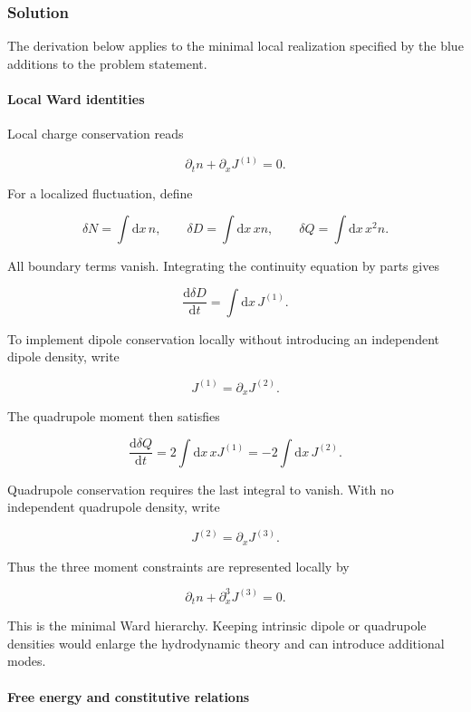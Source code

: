 \subsubsection*{Solution}

\begingroup
\color{blue}

The derivation below applies to the minimal local realization specified by the
blue additions to the problem statement.

\paragraph*{Local Ward identities}

Local charge conservation reads

\[
\partial_t n+\partial_x J^{(1)}=0.
\]

For a localized fluctuation, define

\[
\delta N=\int\mathrm{d}x\,n,
\qquad
\delta D=\int\mathrm{d}x\,x n,
\qquad
\delta Q=\int\mathrm{d}x\,x^2 n.
\]

All boundary terms vanish. Integrating the continuity equation by parts gives

\[
\frac{\mathrm{d}\delta D}{\mathrm{d}t}
=\int\mathrm{d}x\,J^{(1)}.
\]

To implement dipole conservation locally without introducing an independent
dipole density, write

\[
J^{(1)}=\partial_x J^{(2)}.
\]

The quadrupole moment then satisfies

\[
\frac{\mathrm{d}\delta Q}{\mathrm{d}t}
=2\int\mathrm{d}x\,x J^{(1)}
=-2\int\mathrm{d}x\,J^{(2)}.
\]

Quadrupole conservation requires the last integral to vanish. With no
independent quadrupole density, write

\[
J^{(2)}=\partial_x J^{(3)}.
\]

Thus the three moment constraints are represented locally by

\[
\partial_t n+\partial_x^3 J^{(3)}=0.
\tag{1}
\]

This is the minimal Ward hierarchy. Keeping intrinsic dipole or quadrupole
densities would enlarge the hydrodynamic theory and can introduce additional
modes.

\paragraph*{Free energy and constitutive relations}

